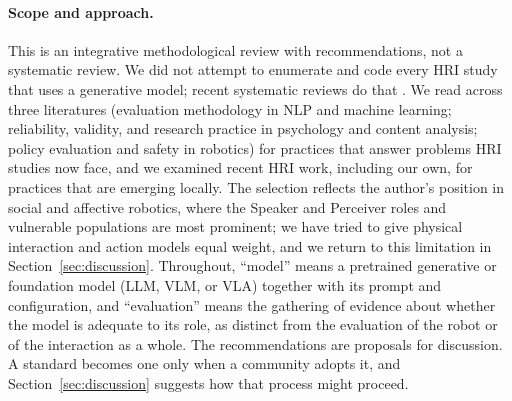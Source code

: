 \paragraph{Scope and approach.} This is an integrative methodological review
with recommendations, not a systematic review. We did not attempt to
enumerate and code every HRI study that uses a generative model; recent
systematic reviews do that \cite{wang2026how,nikolova2026systematic}. We read
across three literatures (evaluation methodology in NLP and machine learning;
reliability, validity, and research practice in psychology and content
analysis; policy evaluation and safety in robotics) for practices that answer
problems HRI studies now face, and we examined recent HRI work, including our
own, for practices that are emerging locally. The selection reflects the
author's position in social and affective robotics, where the Speaker and
Perceiver roles and vulnerable populations are most prominent; we have tried
to give physical interaction and action models equal weight, and we return to
this limitation in Section~\ref{sec:discussion}. Throughout, ``model'' means a
pretrained generative or foundation model (LLM, VLM, or VLA) together with
its prompt and configuration, and ``evaluation'' means the gathering of
evidence about whether the model is adequate to its role, as distinct from
the evaluation of the robot or of the interaction as a whole. The
recommendations are proposals for discussion. A standard becomes one only
when a community adopts it, and Section~\ref{sec:discussion} suggests how that
process might proceed.
